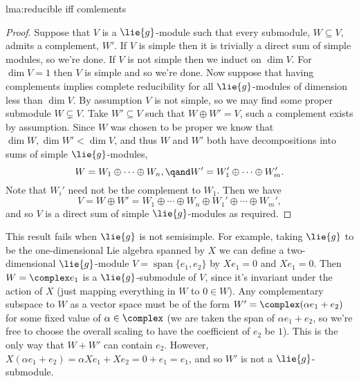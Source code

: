 \documentclass[fleqn]{NotesClass}
\DeclareMathOperator{\Span}{span}
\begin{document}
\begin{lma}{}{lma:reducible iff comlements}
\begin{proof}
            Suppose that \(V\) is a \(\lie{g}\)-module such that every submodule, \(W \subseteq V\), admits a complement, \(W'\).
            If \(V\) is simple then it is trivially a direct sum of simple modules, so we're done.
            If \(V\) is not simple then we induct on \(\dim V\).
            For \(\dim V = 1\) then \(V\) is simple and so we're done.
            Now suppose that having complements implies complete reducibility for all \(\lie{g}\)-modules of dimension less than \(\dim V\).
            By assumption \(V\) is not simple, so we may find some proper submodule \(W \subsetneq V\).
            Take \(W' \subseteq V\) such that \(W \oplus W' = V\), such a complement exists by assumption.
            Since \(W\) was chosen to be proper we know that \(\dim W, \dim W' < \dim V\), and thus \(W\) and \(W'\) both have decompositions into sums of simple \(\lie{g}\)-modules,
            \begin{equation}
                W = W_1 \oplus \dotsb \oplus W_n, \qand W' = W_1' \oplus \dotsb \oplus W_m'.
            \end{equation}
            Note that \(W_i'\) need not be the complement to \(W_1\).
            Then we have
            \begin{equation}
                V = W \oplus W' = W_1 \oplus \dotsb \oplus W_n \oplus W_1' \oplus \dotsb \oplus W_m',
            \end{equation}
            and so \(V\) is a direct sum of simple \(\lie{g}\)-modules as required.
        \end{proof}
    \end{lma}
    
    This result fails when \(\lie{g}\) is not semisimple.
    For example, taking \(\lie{g}\) to be the one-dimensional Lie algebra spanned by \(X\) we can define a two-dimensional \(\lie{g}\)-module \(V = \Span\{e_1, e_2\}\) by \(Xe_1 = 0\) and \(Xe_1 = 0\).
    Then \(W = \complex e_1\) is a \(\lie{g}\)-submodule of \(V\), since it's invariant under the action of \(X\) (just mapping everything in \(W\) to \(0 \in W\)).
    Any complementary subspace to \(W\) as a vector space must be of the form \(W' = \complex (\alpha e_1 + e_2)\) for some fixed value of \(\alpha \in \complex\) (we are taken the span of \(\alpha e_1 + e_2\), so we're free to choose the overall scaling to have the coefficient of \(e_2\) be \(1\)).
    This is the only way that \(W + W'\) can contain \(e_2\).
    However, \(X(\alpha e_1 + e_2) = \alpha X e_1 + X e_2 = 0 + e_1 = e_1\), and so \(W'\) is not a \(\lie{g}\)-submodule.
    
\end{document}
